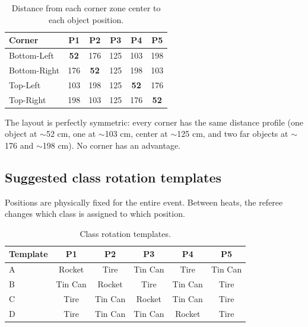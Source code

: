 \documentclass[a4]{article}
\begin{document}
\begin{table}[H]
\centering
\begin{tabular}{lccccc}
\toprule
\textbf{Corner} & \textbf{P1} & \textbf{P2} & \textbf{P3} & \textbf{P4} & \textbf{P5} \\
\midrule
Bottom-Left & \textbf{52} & 176 & 125 & 103 & 198 \\
Bottom-Right & 176 & \textbf{52} & 125 & 198 & 103 \\
Top-Left & 103 & 198 & 125 & \textbf{52} & 176 \\
Top-Right & 198 & 103 & 125 & 176 & \textbf{52} \\
\bottomrule
\end{tabular}
\caption{Distance from each corner zone center to each object position.}
\end{table}

The layout is perfectly symmetric: every corner has the same distance profile (one object at $\sim$52 cm, one at $\sim$103 cm, center at $\sim$125 cm, and two far objects at $\sim$176 and $\sim$198 cm). No corner has an advantage.

\subsection*{Suggested class rotation templates}

Positions are physically fixed for the entire event. Between heats, the referee changes which class is assigned to which position.

\begin{table}[H]
\centering
\begin{tabular}{lccccc}
\toprule
\textbf{Template} & \textbf{P1} & \textbf{P2} & \textbf{P3} & \textbf{P4} & \textbf{P5} \\
\midrule
A & Rocket & Tire & Tin Can & Tire & Tin Can \\
B & Tin Can & Rocket & Tire & Tin Can & Tire \\
C & Tire & Tin Can & Rocket & Tin Can & Tire \\
D & Tire & Tin Can & Tin Can & Rocket & Tire \\
\bottomrule
\end{tabular}
\caption{Class rotation templates.}
\end{table}
\end{document}
